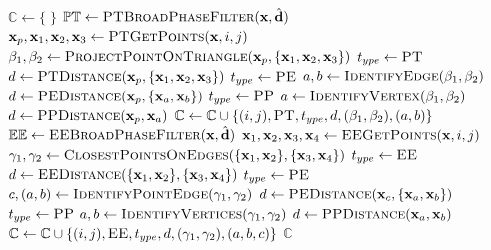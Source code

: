 \documentclass{article}
\begin{document}
\begin{algorithm}[H]
\caption{Collision culling algorithm.}
\label{alg:IPC_collision_culling}
\begin{algorithmic}[1]
\addtolength{\itemsep}{0.2ex}
    \State $\mathbb{C} \gets \{\;\}$
    \State $\mathbb{PT} \gets \textsc{PTBroadPhaseFilter}(\mathbf{x}, \hat{\mathbf{d}})$
        \State $\mathbf{x}_p, \mathbf{x}_1, \mathbf{x}_2, \mathbf{x}_3 \gets \textsc{PTGetPoints}(\mathbf{x}, i, j)$
        \State $\beta_1, \beta_2 \gets \textsc{ProjectPointOnTriangle}(\mathbf{x}_p, \{\mathbf{x}_1, \mathbf{x}_2, \mathbf{x}_3\})$
            \State $t_{ype} \gets \textsc{PT}$
            \State $d \gets \textsc{PTDistance}(\mathbf{x}_p, \{\mathbf{x}_1, \mathbf{x}_2, \mathbf{x}_3\})$ 
            \State $t_{ype} \gets \textsc{PE}$
            \State $a, b \gets \textsc{IdentifyEdge}(\beta_1, \beta_2)$
            \State $d \gets \textsc{PEDistance}(\mathbf{x}_p, \{\mathbf{x}_a, \mathbf{x}_b\})$ 
        \Else
            \State $t_{ype} \gets \textsc{PP}$
            \State $a \gets \textsc{IdentifyVertex}(\beta_1, \beta_2)$
            \State $d \gets \textsc{PPDistance}(\mathbf{x}_p, \mathbf{x}_a)$ 
        \EndIf
            \State $\mathbb{C} \gets \mathbb{C} \cup \{(i, j), \textsc{PT}, t_{ype}, d, (\beta_1, \beta_2), (a, b)\}$
        \EndIf
    \EndFor
    \State $\mathbb{EE} \gets \textsc{EEBroadPhaseFilter}(\mathbf{x}, \hat{\mathbf{d}})$
            \State $\mathbf{x}_1, \mathbf{x}_2, \mathbf{x}_3, \mathbf{x}_4 \gets \textsc{EEGetPoints}(\mathbf{x}, i, j)$
            \State $\gamma_1, \gamma_2 \gets \textsc{ClosestPointsOnEdges}(\{\mathbf{x}_1, \mathbf{x}_2\}, \{\mathbf{x}_3, \mathbf{x}_4\})$
                \State $t_{ype} \gets \textsc{EE}$
                \State $d \gets \textsc{EEDistance}(\{\mathbf{x}_1, \mathbf{x}_2\}, \{\mathbf{x}_3, \mathbf{x}_4\})$
                \State $t_{ype} \gets \textsc{PE}$
                \State $c, (a, b) \gets \textsc{IdentifyPointEdge}(\gamma_1, \gamma_2)$
                \State $d \gets \textsc{PEDistance}(\mathbf{x}_c, \{\mathbf{x}_a, \mathbf{x}_b\})$
            \Else
                \State $t_{ype} \gets \textsc{PP}$
                \State $a, b \gets \textsc{IdentifyVertices}(\gamma_1, \gamma_2)$
                \State $d \gets \textsc{PPDistance}(\mathbf{x}_a, \mathbf{x}_b)$
            \EndIf
                \State $\mathbb{C} \gets \mathbb{C} \cup \{(i, j), \textsc{EE}, t_{ype}, d, (\gamma_1, \gamma_2), (a, b, c)\}$
            \EndIf
        \EndFor
        \State \Return $\mathbb{C}$
\EndFunction
\end{algorithmic}
\end{algorithm}
\end{document}
